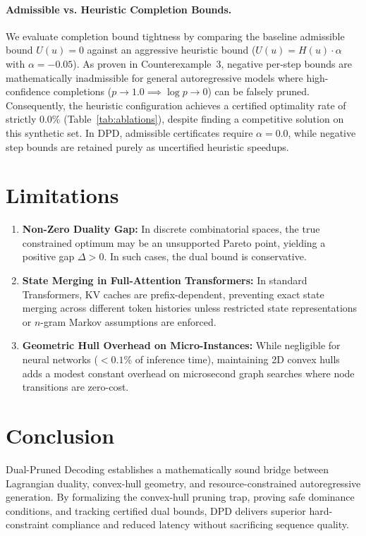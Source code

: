\documentclass[11pt,a4paper]{article}
\theoremstyle{plain}
\theoremstyle{definition}
\theoremstyle{remark}
\begin{document}
\paragraph{Admissible vs. Heuristic Completion Bounds.} We evaluate completion bound tightness by comparing the baseline admissible bound $U(u) = 0$ against an aggressive heuristic bound ($U(u) = H(u) \cdot \alpha$ with $\alpha = -0.05$). As proven in Counterexample~3, negative per-step bounds are mathematically inadmissible for general autoregressive models where high-confidence completions ($p \to 1.0 \implies \log p \to 0$) can be falsely pruned. Consequently, the heuristic configuration achieves a certified optimality rate of strictly $0.0\%$ (Table~\ref{tab:ablations}), despite finding a competitive solution on this synthetic set. In DPD, admissible certificates require $\alpha = 0.0$, while negative step bounds are retained purely as uncertified heuristic speedups.

\section{Limitations}
\begin{enumerate}
    \item \textbf{Non-Zero Duality Gap:} In discrete combinatorial spaces, the true constrained optimum may be an unsupported Pareto point, yielding a positive gap $\Delta > 0$. In such cases, the dual bound is conservative.
    \item \textbf{State Merging in Full-Attention Transformers:} In standard Transformers, KV caches are prefix-dependent, preventing exact state merging across different token histories unless restricted state representations or $n$-gram Markov assumptions are enforced.
    \item \textbf{Geometric Hull Overhead on Micro-Instances:} While negligible for neural networks ($<0.1\%$ of inference time), maintaining 2D convex hulls adds a modest constant overhead on microsecond graph searches where node transitions are zero-cost.
\end{enumerate}

\section{Conclusion}
Dual-Pruned Decoding establishes a mathematically sound bridge between Lagrangian duality, convex-hull geometry, and resource-constrained autoregressive generation. By formalizing the convex-hull pruning trap, proving safe dominance conditions, and tracking certified dual bounds, DPD delivers superior hard-constraint compliance and reduced latency without sacrificing sequence quality.



\end{document}
